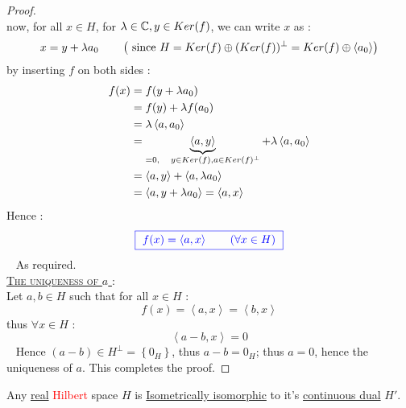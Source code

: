 \begin{proof}
\[{{   }
  }
\]
now, for all $x \in  H $, for $\lambda \in \mathbb{C}, y \in Ker(f) $, we can write $x $ as :  
\[
x = y + \lambda a_0 \quad \quad  \left( 
  \text{ since } H = 
  Ker(f)  \oplus (Ker(f) )^{\bot }= 
  Ker(f) \oplus \left\langle a_0 \right\rangle  
\right)
\]
by inserting $f $ on both sides : 
\begin{align*}
  f(x)  &= f(y + \lambda a_0) \\
        &= f(y)  + \lambda f(a_0)  \\
        &= \lambda \left\langle a, a_0 \right\rangle  \\
        &=
        \underbrace{
        \left\langle a, y \right\rangle 
        }_{=0, \quad y \in  Ker(f), a \in Ker(f)^{\bot } } +  
        \lambda
        \left\langle a, a_0 \right\rangle  \\ 
        &= 
        \left\langle a,y  \right\rangle  + 
        \left\langle a, \lambda a_0 \right\rangle  
        \\
        &= 
        \left\langle 
          a, y + \lambda a_0
        \right\rangle  = \left\langle a,x \right\rangle 
\end{align*}
Hence : 
\[
  \textcolor{blue}{
    \fbox{
      $f(x) = \left\langle a, x \right\rangle \quad \quad (\forall x \in  H)  $
    }
  }
\]
\lefthand ~ As required.
\\
\textsc{
  \large
\underline{
  The uniqueness of $a $
} : 
\warning
\normalfont
}
\\
Let $a,b \in  H $ such that for all $x \in  H $ : 
\[
f(x)  = \left\langle a,x \right\rangle = \left\langle b,x \right\rangle 
\]
thus $\forall x \in  H $ : 
\[
\left\langle a-b, x \right\rangle  = 0
\]
\lefthand ~ Hence $(a-b) \in  H^{\bot } = \left\{ 0_{H} \right\} $, 
thus $a-b = 0_{H}$; thus $a = 0$, hence the uniqueness 
of $a$. This completes the proof. 
\end{proof}
\begin{corollary}[]
  Any \underline{real} \textcolor{red}{Hilbert} space $H $ 
  is \underline{Isometrically isomorphic} to it's \underline{continuous dual} 
  $H'$. 
\end{corollary}
